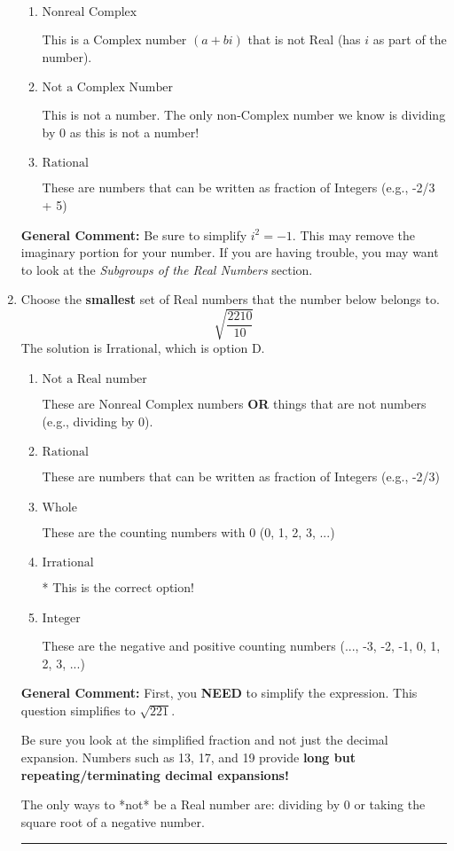 \documentclass{extbook}[14pt]
\newcommand{\litem}[1]{\item #1

\rule{\textwidth}{0.4pt}}
\begin{document}
\begin{enumerate}
{\begin{enumerate}[label=\Alph*.]
* This is the correct option!
\item \( \text{Nonreal Complex} \)

This is a Complex number $(a+bi)$ that is not Real (has $i$ as part of the number).
\item \( \text{Not a Complex Number} \)

This is not a number. The only non-Complex number we know is dividing by 0 as this is not a number!
\item \( \text{Rational} \)

These are numbers that can be written as fraction of Integers (e.g., -2/3 + 5)
\end{enumerate}

\textbf{General Comment:} Be sure to simplify $i^2 = -1$. This may remove the imaginary portion for your number. If you are having trouble, you may want to look at the \textit{Subgroups of the Real Numbers} section.
}
\litem{
Choose the \textbf{smallest} set of Real numbers that the number below belongs to.
\[ \sqrt{\frac{2210}{10}} \]The solution is \( \text{Irrational} \), which is option D.\begin{enumerate}[label=\Alph*.]
\item \( \text{Not a Real number} \)

These are Nonreal Complex numbers \textbf{OR} things that are not numbers (e.g., dividing by 0).
\item \( \text{Rational} \)

These are numbers that can be written as fraction of Integers (e.g., -2/3)
\item \( \text{Whole} \)

These are the counting numbers with 0 (0, 1, 2, 3, ...)
\item \( \text{Irrational} \)

* This is the correct option!
\item \( \text{Integer} \)

These are the negative and positive counting numbers (..., -3, -2, -1, 0, 1, 2, 3, ...)
\end{enumerate}

\textbf{General Comment:} First, you \textbf{NEED} to simplify the expression. This question simplifies to $\sqrt{221}$. 
 
 Be sure you look at the simplified fraction and not just the decimal expansion. Numbers such as 13, 17, and 19 provide \textbf{long but repeating/terminating decimal expansions!} 
 
 The only ways to *not* be a Real number are: dividing by 0 or taking the square root of a negative number. 
 
}
\end{enumerate}
\end{document}
